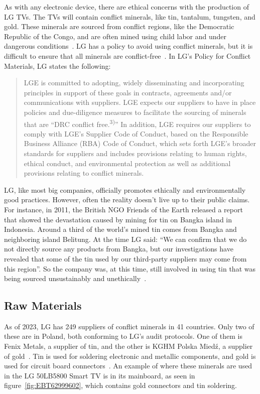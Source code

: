 \documentclass[12pt, letterpaper]{article}
\begin{document}
As with any electronic device, there are ethical concerns with the
production of LG TVs. The TVs will contain conflict minerals, like
tin, tantalum, tungsten, and gold. These minerals are sourced from
conflict regions, like the Democratic
Republic of the Congo, and are often mined using child labor and
under dangerous conditions~\autocite{hower-2013}. LG has a policy to
avoid using conflict
minerals, but it is difficult to ensure that all minerals are
conflict-free~\autocite{lg-electronics-no-date}. In LG's Policy for
Conflict Materials, LG states the following:

\begin{quote}
  LGE is committed to adopting, widely disseminating and incorporating
  principles in support of these goals in contracts, agreements and/or
  communications with suppliers. LGE expects our suppliers to have in
  place policies and due-diligence measures to facilitate the sourcing
of minerals that are ``DRC conflict free.\textsuperscript{3)}'' In
addition, LGE requires
our suppliers to comply with LGE's Supplier Code of Conduct, based on
the Responsible Business Alliance (RBA) Code of Conduct, which sets
forth LGE's broader standards for suppliers and includes provisions
relating to human rights, ethical conduct, and environmental
protection as well as additional provisions relating to conflict minerals.
\end{quote}

LG, like most big companies, officially promotes ethically and
environmentally good practices. However, often the reality doesn't
live up to their public claims. For instance, in 2011, the British
NGO Friends of the Earth released a report that showed the
devastation caused by mining for tin on Bangka island in Indonesia.
Around a third of the world's mined tin comes from Bangka and
neighboring island Belitung. At the time LG said: ``We can confirm
that we do not directly source any products from Bangka, but our
investigations have revealed that some of the tin used by our
third-party suppliers may come from this region''. So the company
was, at this time, still involved in using tin that was being sourced
unsustainably and unethically~\autocite{hower-2013}.

\subsection{Raw Materials}

As of 2023, LG has 249 suppliers of conflict minerals in 41
countries. Only two of these are in Poland, both conforming to LG's
audit protocols. One of them is Fenix Metals, a supplier of tin, and
the other is KGHM Polska Mied\'z, a supplier of
gold~\autocite{lg-electronics-2023}. Tin is used for soldering
electronic and metallic components, and gold is used for circuit
board connectors~\autocite{brigham-2023}. An example of where these
minerals are used in the LG 50LB5800 Smart TV is in its mainboard, as
seen in figure~\ref{fig:EBT62999602}, which contains gold connectors
and tin soldering.
\end{document}
